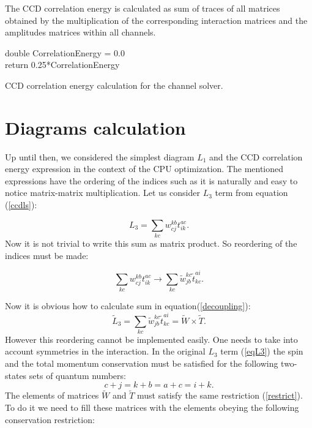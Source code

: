 \documentclass[twoside,english]{uiofysmaster}
\begin{document}
The CCD correlation energy is calculated as sum of traces of all matrices obtained by the multiplication of the corresponding interaction matrices and the amplitudes matrices within all channels. 
\IncMargin{1em}
\begin{algorithm}[h!]
	\SetAlgoLined
	
	\BlankLine
	double CorrelationEnergy = 0.0 \\
		return 0.25*CorrelationEnergy
	\caption{CCD correlation energy calculation for the channel solver.}\label{CCCorrChannels}
	\end{algorithm}\DecMargin{1em}


\section{Diagrams calculation}\label{sectiondiagcalc}

Up until then, we considered the simplest diagram $L_1$ and the CCD correlation energy expression in the context of the CPU optimization. The mentioned expressions have the ordering of the indices such as it is naturally and easy to notice matrix-matrix multiplication.
Let us consider $L_3$ term from equation (\ref{ccdls}):

\begin{equation}\label{eqL3}
	L_3 = \sum\limits_{kc}w_{cj}^{kb}t_{ik}^{ac}.
\end{equation}
Now it is not trivial to write this sum as matrix product. So reordering of the indices must be made:

\begin{equation}\label{decoupling}
 \sum\limits_{kc}w_{cj}^{kb}t_{ik}^{ac} \rightarrow \sum\limits_{kc}\tilde{w}_{jb}^{kc}\tilde{t}_{kc}^{ai}.
\end{equation}

Now it is obvious how to calculate sum in equation(\ref{decoupling}):
\begin{equation}
\tilde{L}_3 = \sum\limits_{kc}\tilde{w}_{jb}^{kc}\tilde{t}_{kc}^{ai} = \tilde{W}\times\tilde{T}.
\end{equation}
However this reordering cannot be implemented easily. One needs to take into account symmetries in the interaction. In the original $L_3$ term (\ref{eqL3}) the spin and the total momentum conservation must be satisfied for the following two-states sets of quantum numbers:
\begin{equation}\label{restrict}
	c + j = k + b = a + c = i + k.
\end{equation}
The elements of matrices $\tilde{W}$ and $\tilde{T}$ must satisfy the same restriction (\ref{restrict}). To do it we need to fill these matrices with the elements obeying the following conservation restriction: 
\end{document}
